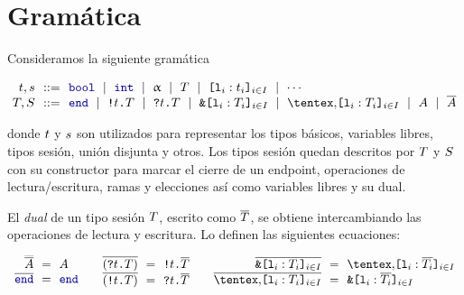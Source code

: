 \section{Gramática}

Consideramos la siguiente gramática

\[
\begin{array}{@{}r@{~~}c@{~~}l@{}}
\TypeT, \TypeS & ::= &
\tbool
\rulemid \tint
\rulemid \tvar
\rulemid \SessionType
\rulemid \set[i\in I]{ \Tag_i : \Type_i }
\rulemid \cdots
\\
\SessionTypeT, \SessionTypeS & ::= &
\End
\rulemid \Out\Type\SessionType
\rulemid \In\Type\SessionType
\rulemid \Branch \set[i\in I]{\Tag_i : \SessionType_i}
\rulemid \Choice \set[i\in I]{\Tag_i : \SessionType_i}
\rulemid \etvar
\rulemid \dual\etvar
\end{array}
\]

donde $t$ y $s$ son utilizados para representar los tipos básicos,
variables libres, tipos sesión, unión disjunta y otros.
Los tipos sesión quedan descritos por $T$ y $S$ con su
constructor para marcar el cierre de un endpoint, operaciones de
lectura/escritura, ramas y elecciones así como variables libres y su dual.

El \emph{dual} de un tipo sesión $T$, escrito como
$\overline{T}$, se obtiene intercambiando las operaciones de lectura y
escritura. Lo definen las siguientes ecuaciones:

\[
\begin{array}{c}
  \begin{array}{@{}r@{~~}c@{~~}l@{}}
    \smash{\dual{\dual\etvar}} & = & \etvar \\
    \dual\End & = & \End \\
  \end{array}
  \qquad
  \begin{array}{@{}r@{~~}c@{~~}l@{}}
    \dual{(\In\Type\SessionType)} & = & \Out\Type\dual\SessionType \\
    \dual{(\Out\Type\SessionType)} & = & \In\Type\dual\SessionType \\
  \end{array}
  \qquad
  \begin{array}{@{}r@{~~}c@{~~}l@{}}
    \dual{\Branch \set[i\in I]{\Tag_i : \SessionType_i}}
    & = & \Choice \set[i\in I]{\Tag_i : \dual{\SessionType_i}} \\
    \dual{\Choice \set[i\in I]{\Tag_i : \SessionType_i}}
    & = & \Branch \set[i\in I]{\Tag_i : \dual{\SessionType_i}} \\
  \end{array}
\end{array}
\]

